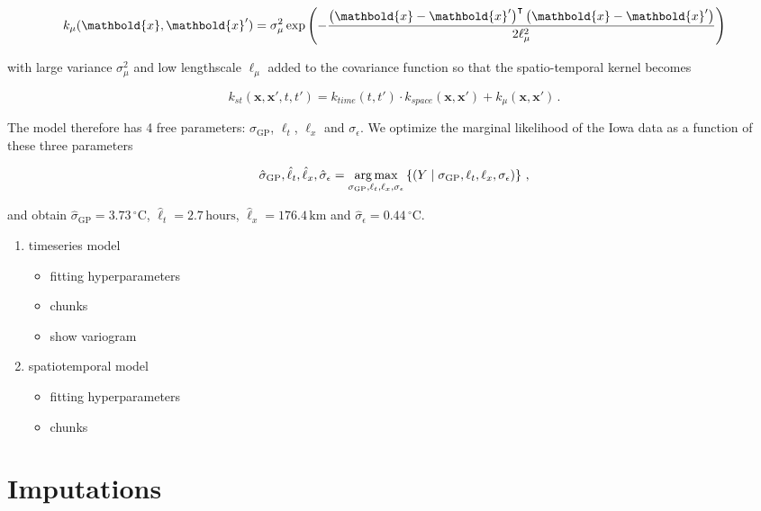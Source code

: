 \documentclass[letter]{article}
\providecommand{\tightlist}{%
      \setlength{\itemsep}{0pt}\setlength{\parskip}{0pt}}
\newcommand{\genericdel}[3]{%
      \left#1#3\right#2
    }
\newcommand{\del}[1]{\genericdel(){#1}}
\newcommand{\cbr}[1]{\genericdel\{\}{#1}}
\DeclareMathOperator*{\argmax}{arg\,max}
\let\Pr\relax
\DeclareMathOperator{\Pr}{\mathbb{P}}
\newcommand{\xvec}{\mathbold{x}}
\newcommand{\trans}{^{\intercal}}
\newcommand{\sigmaf}{\sigma_{\mathrm{GP}}}
\newcommand{\sigman}{\sigma_{\epsilon}}
\newcommand{\degreeC}{{}^\circ \mathrm{C}}
\providecommand{\tightlist}{%
  	  \setlength{\itemsep}{0pt}\setlength{\parskip}{0pt}}
\begin{document}
\begin{equation}
    k_{\mu}(\xvec, \xvec') = \sigma_\mu^2 \exp\del{-\frac{\del{\xvec-\xvec'}\trans\del{\xvec-\xvec'}}{2\ell_\mu^2}}
\end{equation}

with large variance \(\sigma_\mu^2\) and low lengthscale \(\ell_\mu\)
added to the covariance function so that the spatio-temporal kernel
becomes

\begin{equation}
    k_{st}(\xvec,\xvec',t,t') = k_{time}(t,t') \cdot k_{space}(\xvec, \xvec') + k_\mu(\xvec, \xvec') \,.
\end{equation}

The model therefore has 4 free parameters: \(\sigmaf\), \(\ell_t\),
\(\ell_x\) and \(\sigman\). We optimize the marginal likelihood of the
Iowa data as a function of these three parameters

\begin{equation}
\label{eq:optimization}
\hat\sigmaf,\hat\ell_t,\hat\ell_x,\hat\sigman = \argmax_{\sigmaf,\ell_t,\ell_x,\sigman} \cbr{ \Pr\del{ Y \mid {\sigmaf,\ell_t,\ell_x,\sigman} } }\,,
\end{equation}

and obtain \(\hat\sigmaf=3.73\,\degreeC\),
\(\hat\ell_t=2.7\,\mathrm{hours}\), \(\hat\ell_x=176.4\,\mathrm{km}\)
and \(\hat\sigman=0.44\,\degreeC\).
    


    	\begin{enumerate}
\def\labelenumi{\arabic{enumi}.}
\tightlist
\item
  timeseries model

  \begin{itemize}
  \tightlist
  \item
    fitting hyperparameters
  \item
    chunks
  \item
    show variogram
  \end{itemize}
\item
  spatiotemporal model

  \begin{itemize}
  \tightlist
  \item
    fitting hyperparameters
  \item
    chunks
  \end{itemize}
\end{enumerate}
    


    	\section{Imputations}\label{imputations}
\end{document}
